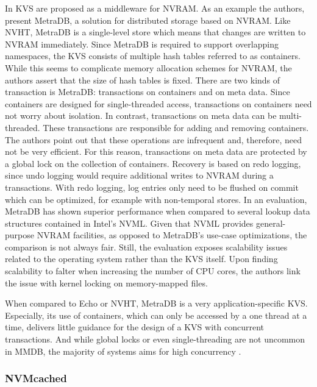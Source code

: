 In \cite{marmol2016nonvolatile} KVS are proposed as a middleware for NVRAM. As
an example the authors, present MetraDB, a solution for distributed storage
based on NVRAM. Like NVHT, MetraDB is a single-level store which means that
changes are written to NVRAM immediately. Since MetraDB is required to support
overlapping namespaces, the KVS consists of multiple hash tables referred to as
containers. While this seems to complicate memory allocation schemes for NVRAM,
the authors assert that the size of hash tables is fixed. There are two kinds of
transaction is MetraDB: transactions on containers and on meta data. Since
containers are designed for single-threaded access, transactions on containers
need not worry about isolation. In contrast, transactions on meta data can be
multi-threaded. These transactions are responsible for adding and removing
containers. The authors point out that these operations are infrequent and,
therefore, need not be very efficient. For this reason, transactions on meta
data are protected by a global lock on the collection of containers. Recovery is
based on redo logging, since undo logging would require additional writes to
NVRAM during a transactions. With redo logging, log entries only need to be
flushed on commit which can be optimized, for example with non-temporal stores.
In an evaluation, MetraDB has shown superior performance when compared to
several lookup data structures contained in Intel's NVML. Given that NVML
provides general-purpose NVRAM facilities, as opposed to MetraDB's use-case
optimizations, the comparison is not always fair. Still, the evaluation exposes
scalability issues related to the operating system rather than the KVS itself.
Upon finding scalability to falter when increasing the number of CPU cores, the
authors link the issue with kernel locking on memory-mapped files.

When compared to Echo or NVHT, MetraDB is a very application-specific KVS.
Especially, its use of containers, which can only be accessed by a one thread at
a time, delivers little guidance for the design of a KVS with concurrent
transactions. And while global locks or even single-threading are not uncommon
in MMDB, the majority of systems aims for high concurrency
\cite{molina1992main}.

\subsubsection{NVMcached}

